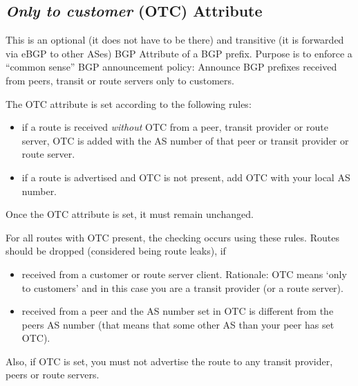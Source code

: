 \subsection{\emph{Only to customer} (OTC) Attribute}
This is an optional (it does not have to be there) and transitive (it is forwarded via eBGP to other ASes) \gls{BGP Attribute} of a BGP prefix.
Purpose is to enforce a ``common sense'' BGP announcement policy: Announce BGP prefixes received from peers, transit or route servers only to customers.

The OTC attribute is set according to the following rules:
\begin{itemize}
  \item if a route is received \emph{without} OTC from a peer, transit provider or route server, OTC is added with the AS number of that peer or transit provider or route server.
  \item if a route is advertised and OTC is not present, add OTC with your local AS number.
\end{itemize}
Once the OTC attribute is set, it must remain unchanged.

For all routes with OTC present, the checking occurs using these rules. Routes should be dropped (considered being route leaks), if
\begin{itemize}
  \item received from a customer or route server client. Rationale: OTC means `only to customers' and in this case you are a transit provider (or a route server).
  \item received from a peer and the AS number set in OTC is different from the peers AS number (that means that some other AS than your peer has set OTC).
\end{itemize}

Also, if OTC is set, you must not advertise the route to any transit provider, peers or route servers.
